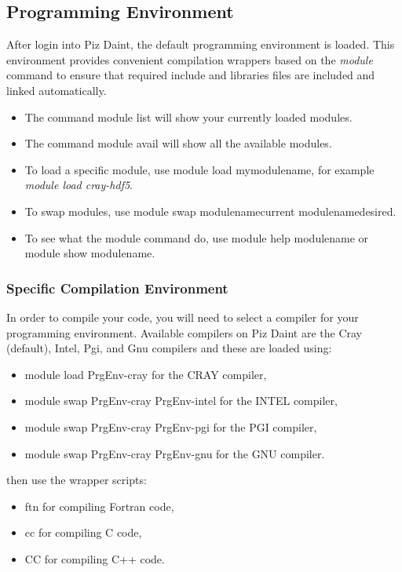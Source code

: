 \documentclass[a4paper,pagesize,12pt]{scrbook}
\begin{document}
\subsection*{Programming Environment}
After login into Piz Daint, the default programming environment is loaded. This environment provides convenient compilation wrappers based on the \emph{module} command to ensure that required include and libraries files are included and linked automatically. 
{\footnotesize \begin{itemize} 
        \item The command \colorbox{mycolor}{module list} will show your currently loaded modules.
        \item The command \colorbox{mycolor}{module avail} will show all the available modules. 
        \item To load a specific module, use \colorbox{mycolor}{module load mymodulename}, for example \emph{module load cray-hdf5}.
        \item To swap modules, use \colorbox{mycolor}{module swap modulenamecurrent modulenamedesired}.
        \item To see what the module command do, use \colorbox{mycolor}{module help modulename} or \colorbox{mycolor}{module show modulename}.
\end{itemize} }

\subsubsection*{Specific Compilation Environment}
In order to compile your code, you will need to select a compiler for your programming environment. Available compilers on Piz Daint are the Cray (default), Intel, Pgi, and Gnu compilers and these are loaded using: 

{\footnotesize \begin{itemize} 
\item \colorbox{mycolor}{module load PrgEnv-cray} for the CRAY compiler,
\item \colorbox{mycolor}{module swap PrgEnv-cray PrgEnv-intel} for the INTEL compiler,
\item \colorbox{mycolor}{module swap PrgEnv-cray PrgEnv-pgi} for the PGI compiler,
\item \colorbox{mycolor}{module swap PrgEnv-cray PrgEnv-gnu} for the GNU compiler.
\end{itemize} }

then use the wrapper scripts:
{\footnotesize \begin{itemize} 
\item \colorbox{mycolor}{ftn} for compiling Fortran code,
\item \colorbox{mycolor}{cc} for compiling C code,
\item \colorbox{mycolor}{CC} for compiling C++ code.
\end{itemize} }
\end{document}
